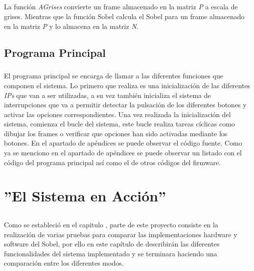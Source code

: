 \documentclass[a4paper,12pt,titlepage,final]{book}
\begin{document}


\paragraph{}
La función \textit{AGrises} convierte un frame almacenado en la matriz \textit{P} a escala de grises. Mientras que la función Sobel calcula el Sobel para un frame almacenado en la matriz \textit{P} y lo almacena en la matriz \textit{N}. 


\section{Programa Principal}
\paragraph{}
El programa principal se encarga de llamar a las diferentes funciones que componen el sistema. Lo primero que realiza es una inicialización de las diferentes \textit{IPs} que van a ser utilizadas, a su vez también inicializa el sistema de interrupciones que va a permitir detectar la pulsación de los diferentes botones y activar las opciones correspondientes. Una vez realizada la inicialización del sistema, comienza el bucle del sistema, este bucle realiza tareas cíclicas como dibujar los frames o verificar que opciones han sido activadas mediante los botones. En el apartado de apéndices se puede observar el código fuente. Como ya se menciono en el apartado de apéndices se puede observar un listado con el código del programa principal así como el de otros códigos del firmware.


\chapter{''El Sistema en Acción''}
\section*{}
\subsection*{}
\subsubsection*{}

\paragraph{}
Como se estableció en el capitulo , parte de este proyecto consiste en la realización de varias pruebas para comparar las implementaciones hardware y software del Sobel, por ello en este capítulo de describirán las diferentes funcionalidades del sistema implementado y se terminara haciendo una comparación entre los diferentes modos.
\end{document}
